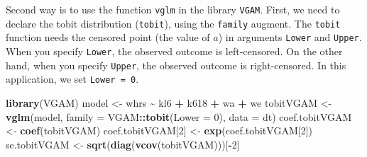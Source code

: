 \documentclass[
  12pt,
]{article}
\newenvironment{Shaded}{\begin{snugshade}}{\end{snugshade}}
\newcommand{\DataTypeTok}[1]{\textcolor[rgb]{0.13,0.29,0.53}{#1}}
\newcommand{\DecValTok}[1]{\textcolor[rgb]{0.00,0.00,0.81}{#1}}
\newcommand{\KeywordTok}[1]{\textcolor[rgb]{0.13,0.29,0.53}{\textbf{#1}}}
\newcommand{\NormalTok}[1]{#1}
\newcommand{\OperatorTok}[1]{\textcolor[rgb]{0.81,0.36,0.00}{\textbf{#1}}}
\newcommand{\OtherTok}[1]{\textcolor[rgb]{0.56,0.35,0.01}{#1}}
\newcommand{\StringTok}[1]{\textcolor[rgb]{0.31,0.60,0.02}{#1}}
\begin{document}
\begin{Shaded}
\end{Shaded}

Second way is to use the function \texttt{vglm} in the library \texttt{VGAM}.
First, we need to declare the tobit distribution (\texttt{tobit}), using the \texttt{family} augment.
The \texttt{tobit} function needs the censored point (the value of \(a\)) in arguments \texttt{Lower} and \texttt{Upper}.
When you specify \texttt{Lower}, the observed outcome is left-censored.
On the other hand, when you specify \texttt{Upper}, the observed outcome is right-censored.
In this application, we set \texttt{Lower\ =\ 0}.

\begin{Shaded}
\begin{Highlighting}[]
\KeywordTok{library}\NormalTok{(VGAM)}
\NormalTok{model \textless{}{-}}\StringTok{ }\NormalTok{whrs }\OperatorTok{\textasciitilde{}}\StringTok{ }\NormalTok{kl6 }\OperatorTok{+}\StringTok{ }\NormalTok{k618 }\OperatorTok{+}\StringTok{ }\NormalTok{wa }\OperatorTok{+}\StringTok{ }\NormalTok{we}
\NormalTok{tobitVGAM \textless{}{-}}\StringTok{ }\KeywordTok{vglm}\NormalTok{(model, }\DataTypeTok{family =}\NormalTok{ VGAM}\OperatorTok{::}\KeywordTok{tobit}\NormalTok{(}\DataTypeTok{Lower =} \DecValTok{0}\NormalTok{), }\DataTypeTok{data =}\NormalTok{ dt)}
\NormalTok{coef.tobitVGAM \textless{}{-}}\StringTok{ }\KeywordTok{coef}\NormalTok{(tobitVGAM)}
\NormalTok{coef.tobitVGAM[}\DecValTok{2}\NormalTok{] \textless{}{-}}\StringTok{ }\KeywordTok{exp}\NormalTok{(coef.tobitVGAM[}\DecValTok{2}\NormalTok{])}
\NormalTok{se.tobitVGAM \textless{}{-}}\StringTok{ }\KeywordTok{sqrt}\NormalTok{(}\KeywordTok{diag}\NormalTok{(}\KeywordTok{vcov}\NormalTok{(tobitVGAM)))[}\OperatorTok{{-}}\DecValTok{2}\NormalTok{]}
\end{Highlighting}
\end{Shaded}
\end{document}
